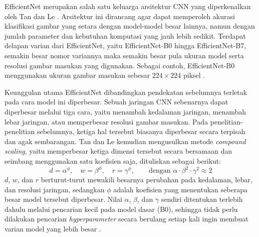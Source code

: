 EfficientNet merupakan salah satu keluarga arsitektur CNN yang diperkenalkan oleh Tan dan Le \cite{tan2019efficientnet}. Arsitektur ini dirancang agar dapat memperoleh akurasi klasifikasi gambar yang setara dengan model-model besar lainnya, namun dengan jumlah parameter dan kebutuhan komputasi yang jauh lebih sedikit. Terdapat delapan varian dari EfficientNet, yaitu EfficientNet-B0 hingga EfficientNet-B7, semakin besar nomor variannya maka semakin besar pula ukuran model serta resolusi gambar masukan yang digunakan. Sebagai contoh, EfficientNet-B0 menggunakan ukuran gambar masukan sebesar $224 \times 224$ piksel \cite{keras2020efficientnet}.

Keunggulan utama EfficientNet dibandingkan pendekatan sebelumnya terletak pada cara model ini diperbesar. Sebuah jaringan CNN sebenarnya dapat diperbesar melalui tiga cara, yaitu menambah kedalaman jaringan, menambah lebar jaringan, atau memperbesar resolusi gambar masukan. Pada penelitian-penelitian sebelumnya, ketiga hal tersebut biasanya diperbesar secara terpisah dan agak sembarangan. Tan dan Le \cite{alshaari2025deepefnet} kemudian mengusulkan metode \textit{compound scaling}, yaitu memperbesar ketiga dimensi tersebut secara bersamaan dan seimbang menggunakan satu koefisien saja, dituliskan sebagai berikut:
\begin{equation}
	d = \alpha^{\phi}, \quad w = \beta^{\phi}, \quad r = \gamma^{\phi}, \qquad \text{dengan } \alpha \cdot \beta^{2} \cdot \gamma^{2} \approx 2
	\label{eq:compound_scaling}
\end{equation}
$d$, $w$, dan $r$ berturut-turut mewakili besarnya perubahan pada kedalaman, lebar, dan resolusi jaringan, sedangkan $\phi$ adalah koefisien yang menentukan seberapa besar model tersebut diperbesar. Nilai $\alpha$, $\beta$, dan $\gamma$ sendiri ditentukan terlebih dahulu melalui pencarian kecil pada model dasar (B0), sehingga tidak perlu dilakukan pencarian \textit{hyperparameter} secara berulang setiap kali ingin membuat varian model yang lebih besar \cite{alshaari2025deepefnet}.

